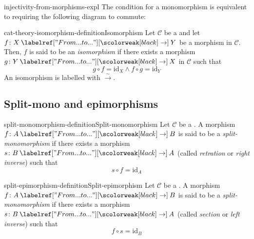 \documentclass[preview]{standalone}
\begin{document}

\begin{snippet}{injectivity-from-morphisms-expl}
    The condition for a monomorphism is equivalent to requiring the following
    diagram to commute:
    \begin{center}
    \end{center}
\end{snippet}

\begin{snippetdefinition}{cat-theory-isomorphism-definition}{Isomorphism}
    Let \(\mathcal{C}\) be a \category
    and let \(f \colon X \fromto Y\) be a morphism in \(\mathcal{C}\).
    Then, \(f\) is said to be an \emph{isomorphism} if
    there exists a morphism \(g \colon Y \fromto X\) in \(\mathcal{C}\)
    such that
    \[
        g \circ f = \text{id}_X \land f \circ g = \text{id}_Y
    \]
    An isomorphism is labelled with \(\xrightarrow{\sim}\).
\end{snippetdefinition}

\subsection{Split-mono and epimorphisms}


\begin{snippetdefinition}{split-monomorphism-definition}{Split-monomorphism}
    Let \(\mathcal{C}\) be a \category. A morphism \(f\colon A \fromto B\)
    is said to be a \emph{split-monomorphism} if there exists a morphism
    \(s \colon B \fromto A\) (called \emph{retration} or \emph{right inverse}) such that
    \[
        s \circ f = \text{id}_A
    \]
\end{snippetdefinition}

\begin{snippetdefinition}{split-epimorphism-definition}{Split-epimorphism}
    Let \(\mathcal{C}\) be a \category. A morphism \(f\colon A \fromto B\)
    is said to be a \emph{split-monomorphism} if there exists a morphism
    \(s \colon B \fromto A\) (called \emph{section} or \emph{left inverse}) such that
    \[
        f \circ s = \text{id}_B
    \]
\end{snippetdefinition}
\end{document}
